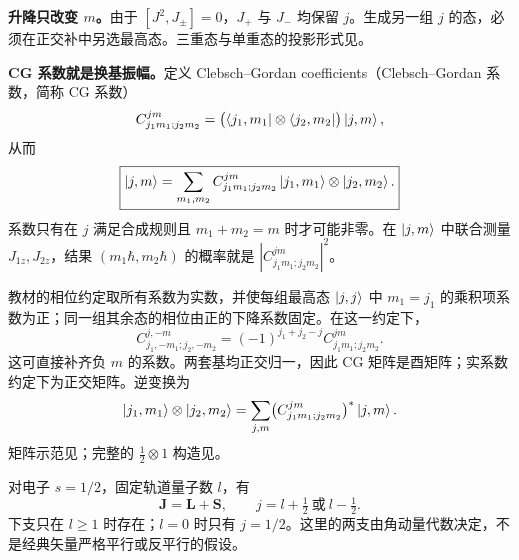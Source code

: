 \textbf{升降只改变 $m$。}由于 $[J^2,J_\pm]=0$，$J_+$ 与 $J_-$ 均保留 $j$。生成另一组 $j$ 的态，必须在正交补中另选最高态。三重态与单重态的投影形式见。

\textbf{CG 系数就是换基振幅。}定义 Clebsch--Gordan coefficients（Clebsch--Gordan 系数，简称 CG 系数）
\begin{equation}
  C^{jm}_{j_1m_1;j_2m_2}
    =\bigl(\left\langle j_1,m_1\right|\otimes\left\langle j_2,m_2\right|\bigr)\left|j,m\right\rangle,
\end{equation}
从而
\begin{equation}
  \boxed{\left|j,m\right\rangle
    =\sum_{m_1,m_2}C^{jm}_{j_1m_1;j_2m_2}
      \left|j_1,m_1\right\rangle\otimes\left|j_2,m_2\right\rangle.}
\end{equation}
系数只有在 $j$ 满足合成规则且 $m_1+m_2=m$ 时才可能非零。在 $\left|j,m\right\rangle$ 中联合测量 $J_{1z},J_{2z}$，结果 $(m_1\hbar,m_2\hbar)$ 的概率就是 $|C^{jm}_{j_1m_1;j_2m_2}|^2$。

教材的相位约定取所有系数为实数，并使每组最高态 $\left|j,j\right\rangle$ 中 $m_1=j_1$ 的乘积项系数为正；同一组其余态的相位由正的下降系数固定。在这一约定下，
\begin{equation}
  \boxed{C^{j,-m}_{j_1,-m_1;j_2,-m_2}
    =(-1)^{j_1+j_2-j}C^{jm}_{j_1m_1;j_2m_2}.}
\end{equation}
这可直接补齐负 $m$ 的系数。两套基均正交归一，因此 CG 矩阵是酉矩阵；实系数约定下为正交矩阵。逆变换为
\begin{equation}
  \left|j_1,m_1\right\rangle\otimes\left|j_2,m_2\right\rangle
    =\sum_{j,m}\bigl(C^{jm}_{j_1m_1;j_2m_2}\bigr)^*\left|j,m\right\rangle.
\end{equation}
矩阵示范见；完整的 $\tfrac12\otimes1$ 构造见。

对电子 $s=1/2$，固定轨道量子数 $l$，有
\begin{equation}
  \boxed{\mathbf J=\mathbf L+\mathbf S,\qquad
    j=l+\tfrac12\ \text{或}\ l-\tfrac12.}
\end{equation}
下支只在 $l\ge1$ 时存在；$l=0$ 时只有 $j=1/2$。这里的两支由角动量代数决定，不是经典矢量严格平行或反平行的假设。

